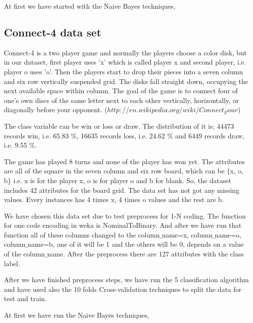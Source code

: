 \documentclass[a4paper]{article}
\begin{document}
At first we have started with the Naive Bayes techniques,











\subsection{Connect-4 data set}

Connect-4 is a two player game and normally the players choose a color disk, but in our dataset, first player uses 'x' which is called player x and second player, i.e. player o uses 'o'. Then the players start to drop their pieces into a seven column and six row vertically suspended grid. The disks fall straight down, occupying the next available space within column. The goal of the game is to connect four of one's own discs of the same letter next to each other vertically, horizontally, or diagonally before your opponent. ($http://en.wikipedia.org/wiki/Connect_Four$) 

The class variable can be win or loss or draw. The distribution of it is; 44473 records win, i.e. 65.83 $\%$, 16635 records loss,  i.e. 24.62 $\%$ and 6449 records draw,  i.e. 9.55 $\%$.

The game has played 8 turns and none of the player has won yet. The attributes are all of the square in the seven column and six row board, which can be $\{$x, o, b$\}$ i.e. x is for the player x, o is for player o and b for blank. So, the dataset includes 42 attributes for the board grid. The data set has not got any missing values. Every instances has 4 times x, 4 times o values and the rest are b. 

We have chosen this data set due to test preprocess for 1-N coding. The function for one code encoding in weka is NominalToBinary. And after we have run that function all of these columns changed to the column$\_$name=x, column$\_$name=o, column$\_$name=b, one of it will be 1 and the others will be 0, depends on a value of the column$\_$name. After the preprocess there are 127 attributes with the class label. 

After we have finished preprocess steps, we have run the 5 classification algorithm and have used also the 10 folds Cross-validation techniques to split the data for test and train. 

At first we have run the Naive Bayes techniques,
\end{document}
